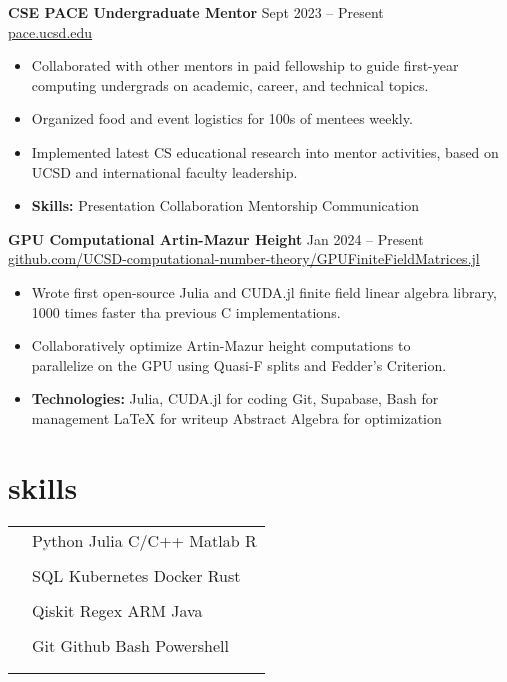 \documentclass[11pt]{article}
\newcommand{\entry}[3]{{{\textbf{#1}}} \hfill #2 \\ #3 \hfill \hspace{0em}}
\newcommand{\tableentry}[3]{\textsc{#1} & #2\expandafter\ifstrequal\expandafter{#3}{}{\\}{\\[6pt]}}
\renewcommand{\>}{\textperiodcentered{}}
\begin{document}
\begin{paracol}{2}
\entry{CSE PACE Undergraduate Mentor}{Sept 2023 -- Present}
{\href{https://pace.ucsd.edu/}{\footnotesize pace.ucsd.edu \normalsize}}
\begin{itemize}[noitemsep,leftmargin=3.5mm,rightmargin=0mm,topsep=3pt]
    \item Collaborated with other mentors in paid fellowship to guide first-year computing undergrads on academic, career, and technical topics.
    \item Organized food and event logistics for 100s of mentees weekly.
    \item Implemented latest CS educational research into mentor activities, based on UCSD and international faculty leadership.
    \item \textbf{Skills:} Presentation \> Collaboration \> Mentorship \> Communication
\end{itemize}
\medskip

\entry{GPU Computational Artin-Mazur Height}{Jan 2024 -- Present}
{\href{https://github.com/UCSD-computational-number-theory/GPUFiniteFieldMatrices.jl}{\footnotesize github.com/UCSD-computational-number-theory/GPUFiniteFieldMatrices.jl \normalsize}}
\begin{itemize}[noitemsep,leftmargin=3.5mm,rightmargin=0mm,topsep=3pt]
    \item Wrote first open-source Julia and CUDA.jl finite field linear algebra library, 1000 times faster tha previous C implementations.
    \item Collaboratively optimize Artin-Mazur height computations to \\ parallelize on the GPU using Quasi-F splits and Fedder's Criterion.
    \item \textbf{Technologies:} Julia, CUDA.jl for coding \> Git, Supabase, Bash for management \> LaTeX for writeup \> Abstract Algebra for optimization
\end{itemize}
\medskip

\switchcolumn

\section{skills}
\begin{supertabular}{rl}

\tableentry{\footnotesize\faCode}
{Python \> Julia \> C/C++ \> Matlab \> R}{}
\tableentry{}{SQL \> Kubernetes \> Docker \> Rust}{}
\tableentry{}{Qiskit \> Regex \> ARM \> Java}{}
\vspace{0.5em}
\tableentry{}{Git \> Github \> Bash \> Powershell}{}


\end{supertabular}
\end{paracol}
\end{document}
